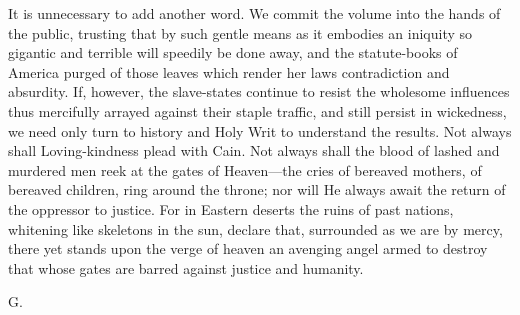 It is unnecessary to add another word. We commit the volume into the hands of
the public, trusting that by such gentle means as it embodies an iniquity so
gigantic and terrible will speedily be done away, and the statute-books of
America purged of those leaves which render her laws contradiction and
absurdity. If, however, the slave-states continue to resist the wholesome
influences thus mercifully arrayed against their staple traffic, and still
persist in wickedness, we need only turn to history and Holy Writ to understand
the results. Not always shall Loving-kindness plead with Cain. Not always shall
the blood of lashed and murdered men reek at the gates of Heaven---the cries of
bereaved mothers, of bereaved children, ring around the throne; nor will He
always await the return of the oppressor to justice. For in Eastern deserts the
ruins of past nations, whitening like skeletons in the sun, declare that,
surrounded as we are by mercy, there yet stands upon the verge of heaven an
avenging angel armed to destroy that whose gates are barred against justice and
humanity.
\begin{flushright}
G.
\end{flushright}
